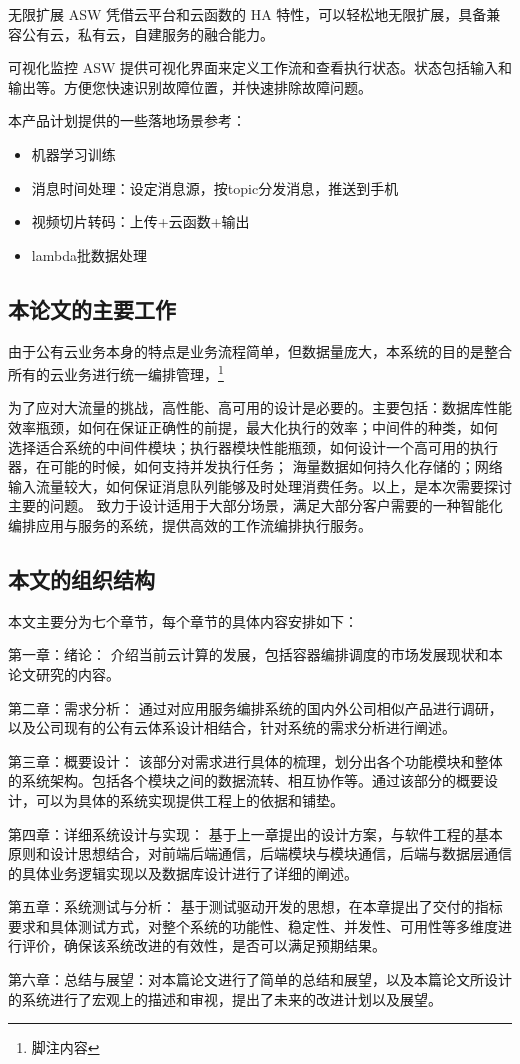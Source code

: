 无限扩展
ASW 凭借云平台和云函数的 HA 特性，可以轻松地无限扩展，具备兼容公有云，私有云，自建服务的融合能力。

可视化监控
ASW 提供可视化界面来定义工作流和查看执行状态。状态包括输入和输出等。方便您快速识别故障位置，并快速排除故障问题。


本产品计划提供的一些落地场景参考：

    \begin{itemize}
        \item 机器学习训练
        \item 消息时间处理：设定消息源，按topic分发消息，推送到手机
        \item 视频切片转码：上传+云函数+输出
        \item lambda批数据处理
    \end{itemize}



\subsection{本论文的主要工作}

由于公有云业务本身的特点是业务流程简单，但数据量庞大，本系统的目的是整合所有的云业务进行统一编排管理，\footnote{脚注内容}

为了应对大流量的挑战，高性能、高可用的设计是必要的。主要包括：数据库性能效率瓶颈，如何在保证正确性的前提，最大化执行的效率；中间件的种类，如何
选择适合系统的中间件模块；执行器模块性能瓶颈，如何设计一个高可用的执行器，在可能的时候，如何支持并发执行任务；
海量数据如何持久化存储的；网络输入流量较大，如何保证消息队列能够及时处理消费任务。以上，是本次需要探讨主要的问题。
致力于设计适用于大部分场景，满足大部分客户需要的一种智能化编排应用与服务的系统，提供高效的工作流编排执行服务。

\subsection{本文的组织结构}
本文主要分为七个章节，每个章节的具体内容安排如下：

第一章：绪论： 介绍当前云计算的发展，包括容器编排调度的市场发展现状和本论文研究的内容。

第二章：需求分析： 通过对应用服务编排系统的国内外公司相似产品进行调研，以及公司现有的公有云体系设计相结合，针对系统的需求分析进行阐述。

第三章：概要设计： 该部分对需求进行具体的梳理，划分出各个功能模块和整体的系统架构。包括各个模块之间的数据流转、相互协作等。通过该部分的概要设计，可以为具体的系统实现提供工程上的依据和铺垫。

第四章：详细系统设计与实现： 基于上一章提出的设计方案，与软件工程的基本原则和设计思想结合，对前端后端通信，后端模块与模块通信，后端与数据层通信的具体业务逻辑实现以及数据库设计进行了详细的阐述。

第五章：系统测试与分析： 基于测试驱动开发的思想，在本章提出了交付的指标要求和具体测试方式，对整个系统的功能性、稳定性、并发性、可用性等多维度进行评价，确保该系统改进的有效性，是否可以满足预期结果。

第六章：总结与展望：对本篇论文进行了简单的总结和展望，以及本篇论文所设计的系统进行了宏观上的描述和审视，提出了未来的改进计划以及展望。


